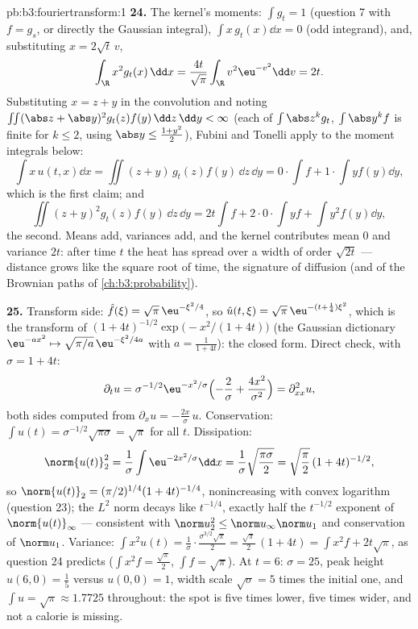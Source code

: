 \begin{solution}{pb:b3:fouriertransform:1}
\textbf{24.} The kernel's moments: $\int g_t = 1$ (question
7 with $f = g_s$, or directly the Gaussian integral), $\int
x\,g_t(x)\dd x = 0$ (odd integrand), and, substituting $x =
2\sqrt t\,v$,
\[
\int_\R x^2g_t(x)\,\dd x
= \frac{4t}{\sqrt\pi}\int_\R v^2\eu^{-v^2}\dd v = 2t .
\]
Substituting $x = z + y$ in the convolution and noting
$\iint(\abs z + \abs y)^2g_t(z)f(y)\,\dd z\,\dd y < \infty$
(each of $\int\abs z^kg_t$, $\int\abs y^kf$ is finite for $k
\leq 2$, using $\abs y \leq \frac{1 + y^2}2$), Fubini and
Tonelli apply to the moment integrals below:
\[
\int x\,u(t,x)\dd x = \iint (z + y)\,g_t(z)f(y)\,\dd z\,\dd
y = 0\cdot\!\int\! f + 1\cdot\!\int\! yf(y)\dd y,
\]
which is the first claim; and
\[
\iint (z+y)^2g_t(z)f(y)\,\dd z\,\dd y
= 2t\int f + 2\cdot0\cdot\!\int\! yf + \int y^2f(y)\dd y ,
\]
the second. Means add, variances add, and the kernel
contributes mean $0$ and variance $2t$: after time $t$ the
heat has spread over a width of order $\sqrt{2t}$ ---
distance grows like the square root of time, the signature
of diffusion (and of the Brownian paths of
\cref{ch:b3:probability}).

\textbf{25.} Transform side: $\hat f(\xi) =
\sqrt\pi\,\eu^{-\xi^2/4}$, so $\hat u(t,\xi) =
\sqrt\pi\,\eu^{-(t + \frac14)\xi^2}$, which is the transform
of $(1 + 4t)^{-1/2}\exp\bigl(-x^2/(1+4t)\bigr)$ (the
Gaussian dictionary $\eu^{-ax^2} \mapsto
\sqrt{\pi/a}\,\eu^{-\xi^2/4a}$ with $a = \frac1{1+4t}$):
the closed form. Direct check, with $\sigma = 1 + 4t$:
\[
\partial_tu = \sigma^{-1/2}\eu^{-x^2/\sigma}
\Bigl(-\frac2\sigma + \frac{4x^2}{\sigma^2}\Bigr)
= \partial^2_{xx}u ,
\]
both sides computed from $\partial_xu =
-\frac{2x}\sigma\,u$. Conservation: $\int u(t) =
\sigma^{-1/2}\sqrt{\pi\sigma} = \sqrt\pi$ for all $t$.
Dissipation:
\[
\norm{u(t)}_2^2 = \frac1\sigma\int\eu^{-2x^2/\sigma}\dd x
= \frac1\sigma\sqrt{\frac{\pi\sigma}2}
= \sqrt{\frac\pi2}\,(1+4t)^{-1/2},
\]
so $\norm{u(t)}_2 = (\pi/2)^{1/4}(1+4t)^{-1/4}$,
nonincreasing with convex logarithm (question 23); the
$L^2$ norm decays like $t^{-1/4}$, exactly half the
$t^{-1/2}$ exponent of $\norm{u(t)}_\infty$ --- consistent
with $\norm u_2^2 \leq \norm u_\infty\norm u_1$ and
conservation of $\norm u_1$. Variance: $\int x^2u(t) =
\frac1\sigma\cdot\frac{\sigma^{3/2}\sqrt\pi}2 =
\frac{\sqrt\pi}2\,(1 + 4t) = \int x^2f + 2t\sqrt\pi$, as
question 24 predicts ($\int x^2f = \frac{\sqrt\pi}2$, $\int
f = \sqrt\pi$). At $t = 6$: $\sigma = 25$, peak height
$u(6, 0) = \frac15$ versus $u(0,0) = 1$, width scale
$\sqrt\sigma = 5$ times the initial one, and $\int u =
\sqrt\pi \approx 1.7725$ throughout: the spot is five times
lower, five times wider, and not a calorie is missing.
\end{solution}
